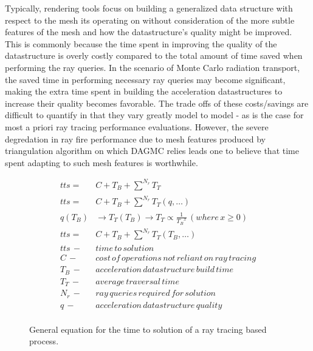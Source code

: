 \documentclass[12pt, a4paper]{article}
\begin{document}
Typically, rendering tools focus on building a generalized data structure with respect to the mesh its operating on without consideration of the more subtle features of the mesh and how the datastructure's quality might be improved. This is commonly because the time spent in improving the quality of the datastructure is overly costly compared to the total amount of time saved when performing the ray queries. In the scenario of Monte Carlo radiation transport, the saved time in performing necessary ray queries may become significant, making the extra time spent in building the acceleration datastructures to increase their quality becomes favorable. The trade offs of these costs/savings are difficult to quantify in that they vary greatly model to model - as is the case for most a priori ray tracing performance evaluations. However, the severe degredation in ray fire performance due to mesh features produced by triangulation algorithm on which DAGMC relies leads one to believe that time spent adapting to such mesh features is worthwhile.

\begin{figure}[H]
  \centering
  \begin{align*}
    tts =\, & C + T_{B} + \sum_{}^{N_{r}} T_{T} \\
    tts =\, & C + T_{B} + \sum_{}^{N_{r}} T_{T}(q,\ldots) \\
    q(T_{B}) & \rightarrow T_{T}(T_{B}) \rightarrow T_{T} \propto \frac{1}{{T_{B}}^{x}} \, (where \, x \geq 0) \\
    tts =\, & C + T_{B} + \sum_{}^{N_{r}} T_{T}(T_{B},\ldots) \\
    tts \, - & time\, to\, solution \\
    C \, - & cost\, of\, operations \, not \, reliant \, on \, ray \, tracing \\
    T_{B} \, - & acceleration\, datastructure\, build\, time \\
    T_{T} \, - & average\, traversal\, time \\
    N_{r} \, - & ray\, queries \, required\, for\, solution \\
    q \, - & acceleration\, datastructure\, quality \\
  \end{align*}
  \caption{General equation for the time to solution of a ray tracing based process.}
  \label{tts_est}
\end{figure}
\end{document}
